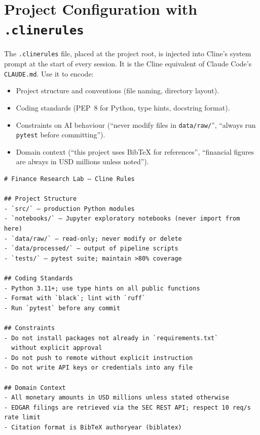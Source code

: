 \section{Project Configuration with \texttt{.clinerules}}
\label{app:cline:clinerules}

The \texttt{.clinerules} file, placed at the project root, is injected into
Cline's system prompt at the start of every session.  It is the Cline
equivalent of Claude Code's \texttt{CLAUDE.md}.  Use it to encode:

\begin{itemize}
  \item Project structure and conventions (file naming, directory layout).
  \item Coding standards (PEP~8 for Python, type hints, docstring format).
  \item Constraints on AI behaviour (``never modify files in \texttt{data/raw/}'',
        ``always run \texttt{pytest} before committing'').
  \item Domain context (``this project uses BibTeX for references'',
        ``financial figures are always in USD millions unless noted'').
\end{itemize}

\begin{verbatim}
# Finance Research Lab — Cline Rules

## Project Structure
- `src/` — production Python modules
- `notebooks/` — Jupyter exploratory notebooks (never import from here)
- `data/raw/` — read-only; never modify or delete
- `data/processed/` — output of pipeline scripts
- `tests/` — pytest suite; maintain >80% coverage

## Coding Standards
- Python 3.11+; use type hints on all public functions
- Format with `black`; lint with `ruff`
- Run `pytest` before any commit

## Constraints
- Do not install packages not already in `requirements.txt`
  without explicit approval
- Do not push to remote without explicit instruction
- Do not write API keys or credentials into any file

## Domain Context
- All monetary amounts in USD millions unless stated otherwise
- EDGAR filings are retrieved via the SEC REST API; respect 10 req/s rate limit
- Citation format is BibTeX authoryear (biblatex)
\end{verbatim}

